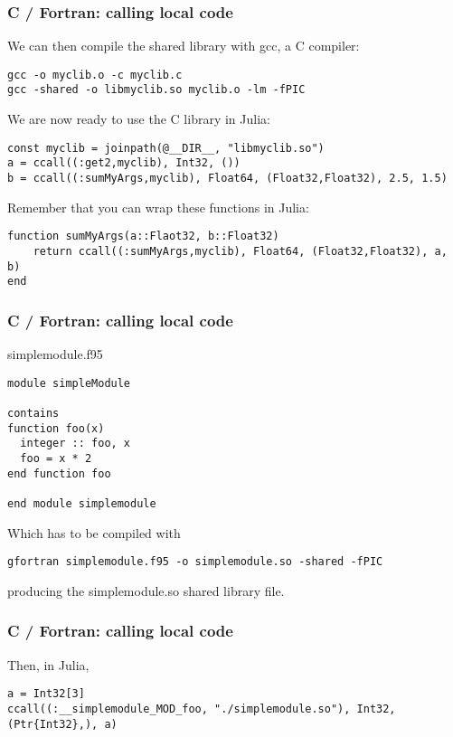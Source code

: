 \documentclass{beamer}
\begin{document}
\begin{frame}[fragile]
\frametitle{C / Fortran: calling local code}

We can then compile the shared library with gcc, a C compiler:

\begin{lstlisting}
gcc -o myclib.o -c myclib.c
gcc -shared -o libmyclib.so myclib.o -lm -fPIC
\end{lstlisting}
We are now ready to use the C library in Julia:

\begin{lstlisting}
const myclib = joinpath(@__DIR__, "libmyclib.so")
a = ccall((:get2,myclib), Int32, ())
b = ccall((:sumMyArgs,myclib), Float64, (Float32,Float32), 2.5, 1.5)
\end{lstlisting}

Remember that you can wrap these functions in Julia:

\begin{lstlisting}
function sumMyArgs(a::Flaot32, b::Float32)
    return ccall((:sumMyArgs,myclib), Float64, (Float32,Float32), a, b)
end
\end{lstlisting}

\end{frame}

\begin{frame}[fragile]
\frametitle{C / Fortran: calling local code}
simplemodule.f95

\begin{lstlisting}
module simpleModule

contains
function foo(x)
  integer :: foo, x
  foo = x * 2
end function foo

end module simplemodule
\end{lstlisting}

Which has to be compiled with

\begin{lstlisting}
gfortran simplemodule.f95 -o simplemodule.so -shared -fPIC
\end{lstlisting}

producing the simplemodule.so shared library file.

\end{frame}

\begin{frame}[fragile]
\frametitle{C / Fortran: calling local code}
Then, in Julia,

\begin{lstlisting}
a = Int32[3]
ccall((:__simplemodule_MOD_foo, "./simplemodule.so"), Int32, (Ptr{Int32},), a)
\end{lstlisting}
\end{frame}
\end{document}
